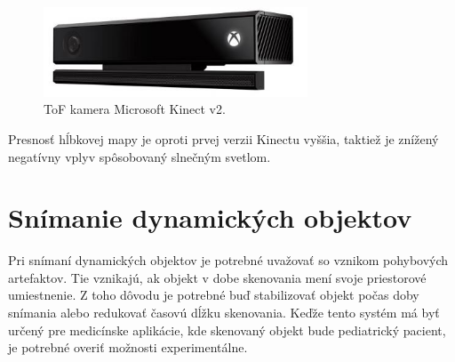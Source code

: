 \begin{figure}[H]
	\centering
	\includegraphics[width=0.7\textwidth]{figures/kinect.png}
	\caption{ToF kamera Microsoft Kinect v2.}
	\label{fig::kinect}
\end{figure}

Presnosť hĺbkovej mapy je oproti prvej verzii Kinectu vyššia, taktiež je znížený negatívny vplyv spôsobovaný slnečným svetlom.


%
%
%

\section{Snímanie dynamických objektov}

Pri snímaní dynamických objektov je potrebné uvažovať so vznikom pohybových artefaktov. Tie vznikajú, ak objekt v dobe skenovania mení svoje priestorové umiestnenie. Z toho dôvodu je potrebné buď stabilizovať objekt počas doby snímania alebo redukovať časovú dĺžku skenovania. Keďže tento systém má byť určený pre medicínske aplikácie, kde skenovaný objekt bude pediatrický pacient, je potrebné overiť možnosti experimentálne.


